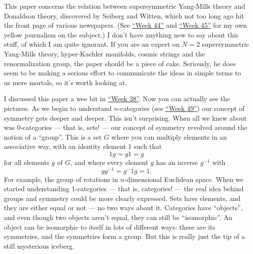\documentclass{article}
\def\tightlist{}
\renewcommand{\texttt}[1]{%
  \begingroup
  \ttfamily
  \begingroup\lccode`~=`/\lowercase{\endgroup\def~}{/\discretionary{}{}{}}%
  \begingroup\lccode`~=`[\lowercase{\endgroup\def~}{[\discretionary{}{}{}}%
  \begingroup\lccode`~=`.\lowercase{\endgroup\def~}{.\discretionary{}{}{}}%
  \catcode`/=\active\catcode`[=\active\catcode`.=\active
  \scantokens{#1\noexpand}%
  \endgroup
}
\begin{document}
This paper concerns the relation between supersymmetric Yang-Mills
theory and Donaldson theory, discovered by Seiberg and Witten, which not
too long ago hit the front page of various newspapers. (See
\protect\hyperlink{week44}{``Week 44''} and
\protect\hyperlink{week45}{``Week 45''} for my own yellow journalism on
the subject.) I don't have anything new to say about this stuff, of
which I am quite ignorant. If you are an expert on \(N = 2\)
supersymmetric Yang-Mills theory, hyper-Kaehler manifolds, cosmic
strings and the renormalization group, the paper should be a piece of
cake. Seriously, he does seem to be making a serious effort to
communicate the ideas in simple terms to us mere mortals, so it's worth
looking at.


I discussed this paper a wee bit in \protect\hyperlink{week38}{``Week
38''}. Now you can actually see the pictures. As we begin to understand
\(n\)-categories (see \protect\hyperlink{week49}{``Week 49''}) our
concept of symmetry gets deeper and deeper. This isn't surprising. When
all we knew about was 0-categories --- that is, sets! --- our concept of
symmetry revolved around the notion of a ``group''. This is a set \(G\)
where you can multiply elements in an associative way, with an identity
element 1 such that \[1g = g1 = g\] for all elements \(g\) of \(G\), and
where every element \(g\) has an inverse \(g^{-1}\) with
\[gg^{-1} = g{^-1}g = 1.\] For example, the group of rotations in
\(n\)-dimensional Euclidean space. When we started understanding
1-categories --- that is, categories! --- the real idea behind groups
and symmetry could be more clearly expressed. Sets have elements, and
they are either equal or not --- no two ways about it. Categories have
``objects'', and even though two objects aren't equal, they can still be
``isomorphic''. An object can be isomorphic to itself in lots of
different ways: these are its symmetries, and the symmetries form a
group. But this is really just the tip of a still mysterious iceberg.
\end{document}
